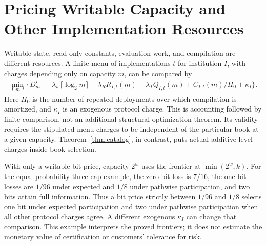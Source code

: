 \section{Pricing Writable Capacity and Other Implementation Resources}\label{sec:r37-resources}
Writable state, read-only constants, evaluation work, and compilation are different resources. A finite menu of implementations $t$ for institution $I$, with charges depending only on capacity $m$, can be compared by
\begin{align}\label{eq:r37-design}
 \min_{I,m,t}\bigl\{D_m^I
 &+\lambda_w\lceil\log_2m\rceil+\lambda_R R_{I,t}(m)
 +\lambda_T Q_{I,t}(m)+C_{I,t}(m)/H_0+\kappa_I\bigr\}.
\end{align}
Here $H_0$ is the number of repeated deployments over which compilation is amortized, and $\kappa_I$ is an exogenous protocol charge. This is accounting followed by finite comparison, not an additional structural optimization theorem. Its validity requires the stipulated menu charges to be independent of the particular book at a given capacity. Theorem~\ref{thm:catalog}, in contrast, puts actual additive level charges inside book selection.

With only a writable-bit price, capacity $2^w$ uses the frontier at $\min(2^w,k)$. For the equal-probability three-cap example, the zero-bit loss is $7/16$, the one-bit losses are $1/96$ under expected and $1/8$ under pathwise participation, and two bits attain full information. Thus a bit price strictly between $1/96$ and $1/8$ selects one bit under expected participation and two under pathwise participation when all other protocol charges agree. A different exogenous $\kappa_I$ can change that comparison. This example interprets the proved frontiers; it does not estimate the monetary value of certification or customers' tolerance for risk.

